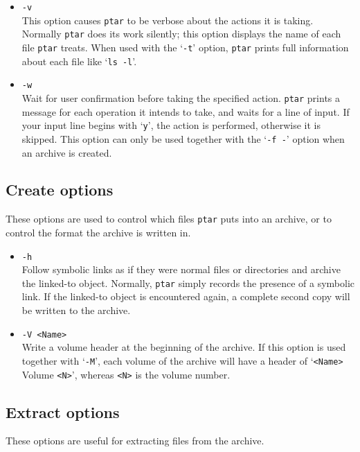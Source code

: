 \begin{itemize}
  \item {\tt -v} \\
        This option causes {\tt ptar} to be verbose about the actions it is 
        taking. Normally {\tt ptar} does its work silently; this option 
        displays the name of each file {\tt ptar} treats. When used with the
        `{\tt -t}' option, {\tt ptar} prints full information about each file
        like `{\tt ls -l}'.

  \item {\tt -w} \\
        Wait for user confirmation before taking the specified action. 
        {\tt ptar} prints a message for each operation it intends to take, and 
        waits for a line of input. If your input line begins with `{\tt y}',
        the action is performed, otherwise it is skipped. This option can only 
        be used together with the `{\tt -f -}' option when an archive is
        created.

\end{itemize}

\subsection{Create options}
These options are used to control which files {\tt ptar} puts into an archive, 
or to control the format the archive is written in.

\begin{itemize}

  \item {\tt -h} \\
        Follow symbolic links as if they were normal files or directories and 
        archive the linked-to object. Normally, {\tt ptar} simply records the 
        presence of a symbolic link. If the linked-to object is encountered 
        again, a complete second copy will be written to the archive.

  \item {\tt -V <Name>} \\
        Write a volume header at the beginning of the archive. If this option 
        is used together with `{\tt -M}', each volume of the archive will have
        a header of `{\tt <Name>} Volume {\tt <N>}', whereas {\tt <N>} is the
        volume number.

\end{itemize}

\subsection{Extract options}
These options are useful for extracting files from the archive. 

